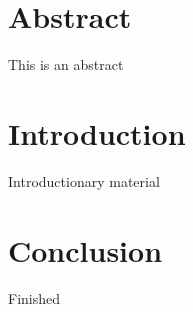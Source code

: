 \documentclass{ituthesis}
\begin{document}

\frontmatter

\thetitlepage
\newpage

\chapter*{Abstract}
This is an abstract

\cleardoublepage
\setcounter{tocdepth}{1}
\tableofcontents

\mainmatter
\chapter{Introduction}
Introductionary material

\chapter{Conclusion}
Finished
\end{document}
